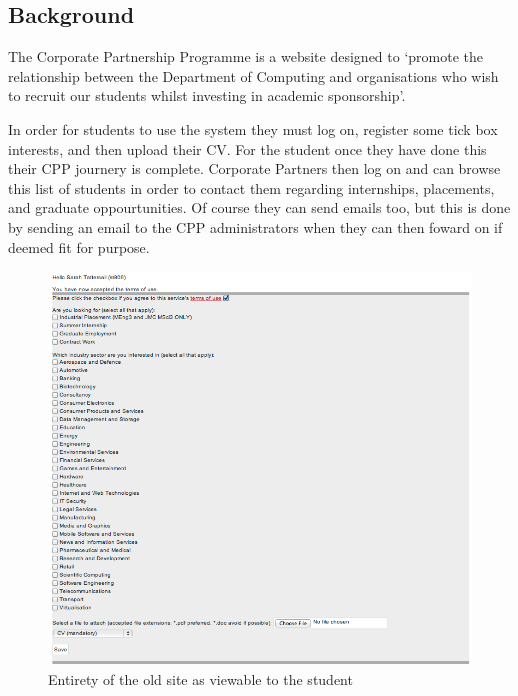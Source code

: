 \subsection{Background}
The Corporate Partnership Programme is a website designed to `promote the relationship between the Department of Computing and organisations who wish to recruit our students whilst investing in academic sponsorship'\cite{doc-cpp}.

In order for students to use the system they must log on, register some tick box interests, and then upload their CV.
For the student once they have done this their CPP journery is complete.
Corporate Partners then log on and can browse this list of students in order to contact them regarding internships, placements, and graduate oppourtunities. Of course they can send emails too, but this is done by sending an email to the CPP administrators when they can then foward on if deemed fit for purpose.

\begin{figure}[H]\centering
\includegraphics[scale=0.5]{images/introduction/old_cpp}
\caption{Entirety of the old site as viewable to the student}
\end{figure}
